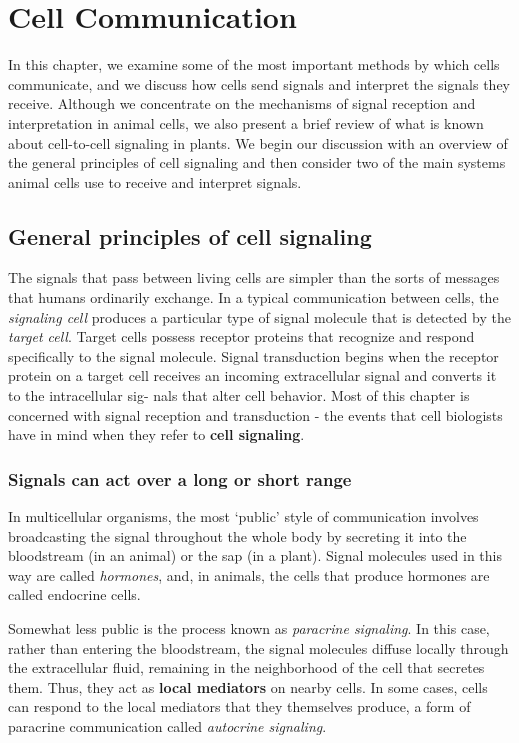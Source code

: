 \chapter{Cell Communication}

In this chapter, we examine some of the most important methods by which
cells communicate, and we discuss how cells send signals and interpret
the signals they receive. Although we concentrate on the mechanisms of
signal reception and interpretation in animal cells, we also present a brief
review of what is known about cell-to-cell signaling in plants. We begin
our discussion with an overview of the general principles of cell signaling
and then consider two of the main systems animal cells use to receive
and interpret signals.

\section{General principles of cell signaling}

The signals that pass between living cells are simpler than the sorts of
messages that humans ordinarily exchange. In a typical communication
between cells, the \textit{signaling cell} produces a particular type of 
signal molecule that is detected by the \textit{target cell}.
Target cells possess receptor proteins
that recognize and respond specifically to the signal molecule. Signal
transduction begins when the receptor protein on a target cell receives
an incoming extracellular signal and converts it to the intracellular sig-
nals that alter cell behavior. Most of this chapter is concerned with signal
reception and transduction - the events that cell biologists have in mind
when they refer to \textbf{cell signaling}.

\subsection{Signals can act over a long or short range}

In multicellular organisms, the most `public' style of communication
involves broadcasting the signal throughout the whole body by secreting
it into the bloodstream (in an animal) or the sap (in a plant). Signal molecules 
used in this way are called \emph{hormones}, and, in animals, the cells
that produce hormones are called endocrine cells.

Somewhat less public is the process known as \textit{paracrine signaling}. In this
case, rather than entering the bloodstream, the signal molecules diffuse
locally through the extracellular fluid, remaining in the neighborhood of
the cell that secretes them. Thus, they act as \textbf{local mediators} on nearby
cells. In some cases, cells can respond to
the local mediators that they themselves produce, a form of paracrine
communication called \textit{autocrine signaling}.

